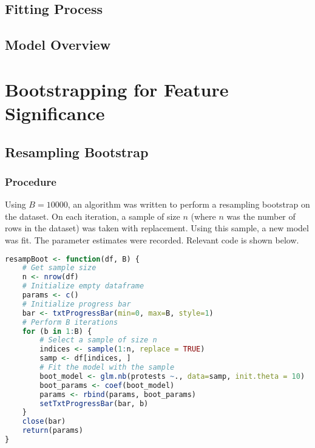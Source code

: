 \documentclass[12pt]{article}
\begin{document}
\subsection{Fitting Process}
\subsection{Model Overview}

\newpage
\section{Bootstrapping for Feature Significance}
\subsection{Resampling Bootstrap}
\subsubsection*{Procedure}
Using $B = 10000$, an algorithm was written to perform a resampling bootstrap on the dataset. On each iteration, a sample of size $n$ (where $n$ was the number of rows in the dataset) was taken with replacement. Using this sample, a new model was fit. The parameter estimates were recorded. Relevant code is shown below.

\vspace{1cm}
\begin{lstlisting}[language=R]
resampBoot <- function(df, B) {
    # Get sample size
    n <- nrow(df)
    # Initialize empty dataframe
    params <- c()
    # Initialize progress bar
    bar <- txtProgressBar(min=0, max=B, style=1)
    # Perform B iterations
    for (b in 1:B) {
        # Select a sample of size n
        indices <- sample(1:n, replace = TRUE)
        samp <- df[indices, ]
        # Fit the model with the sample
        boot_model <- glm.nb(protests ~., data=samp, init.theta = 10)
        boot_params <- coef(boot_model)
        params <- rbind(params, boot_params)
        setTxtProgressBar(bar, b)
    }
    close(bar)
    return(params)
}
\end{lstlisting}
\end{document}
